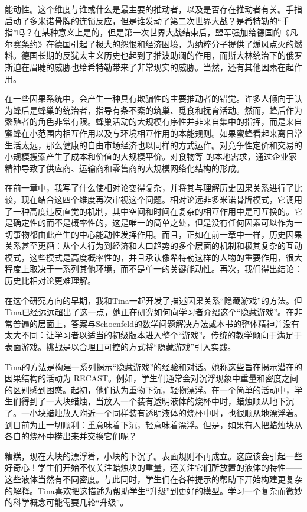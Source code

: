 能动性。这个维度与谁或什么是最主要的推动者，以及是否存在推动者有关。手指启动了多米诺骨牌的连锁反应，但是谁发动了第二次世界大战？是希特勒的“手指”吗？在某种意义上是的，但是第一次世界大战结束后，盟军强加给德国的《凡尔赛条约》在德国引起了极大的怨恨和经济困境，为纳粹分子提供了煽风点火的燃料。德国长期的反犹太主义历史也起到了推波助澜的作用，而斯大林统治下的俄罗斯迫在眉睫的威胁也给希特勒带来了非常现实的威胁。当然，还有其他因素在起作用。

在一些因果系统中，会产生一种具有欺骗性的主要推动者的错觉。许多人倾向于认为蜂后是蜂巢的统治者，指导有条不紊的筑巢、觅食和抚育活动。然而，蜂后作为繁殖者的角色非常有限。蜂巢活动的大规模有序性并非来自集中的指挥，而是来自蜜蜂在小范围内相互作用以及与环境相互作用的本能规则。如果蜜蜂看起来离日常生活太远，那么健康的自由市场经济也以同样的方式运作。对竞争性定价和交易的小规模搜索产生了成本和价值的大规模平价。对食物等 的本地需求，通过企业家精神导致了供应商、运输商和零售商的大规模网络化结构的形成。

在前一章中，我写了什么使相对论变得复杂，并将其与理解历史因果关系进行了比较，现在结合这四个维度再次审视这个问题。相对论远非多米诺骨牌模式，它调用了一种高度违反直觉的机制，其中空间和时间在复杂的相互作用中是可互换的。它是确定性的而不是概率性的，这是唯一的简单之处，但是没有任何因素可以作为一切事物都由此产生的中心能动性发挥作用。而且，正如在前一章中一样，历史因果关系甚至更糟：从个人行为到经济和人口趋势的多个层面的机制和极其复杂的互动模式，这些模式是高度概率性的，并且承认像希特勒这样的人物的重要作用，很大程度上取决于一系列其他环境，而不是单一的关键能动性。再次，我们得出结论：历史比相对论更难理解。

在这个研究方向的早期，我和Tina一起开发了描述因果关系“隐藏游戏”的方法。但Tina已经远远超出了这一点，她正在研究如何向学习者介绍这个“隐藏游戏”。在非常普遍的层面上，答案与Schoenfeld的数学问题解决方法或本书的整体精神并没有太大不同：让学习者以适当的初级版本进入整个“游戏”。传统的教学倾向于满足于表面游戏。挑战是以合理且可控的方式将“隐藏游戏”引入实践。

Tina的方法是构建一系列揭示“隐藏游戏”的经验和对话。她称这些旨在揭示潜在的因果结构的活动为 RECAST。例如，学生们通常会对沉浮现象中重量和密度之间的区别感到困惑。起初，他们认为重物下沉，轻物漂浮。在一个简单的活动中，学生们得到了一大块蜡烛，当放入一个装有透明液体的烧杯中时，蜡烛顺从地下沉了。一小块蜡烛放入附近一个同样装有透明液体的烧杯中时，也很顺从地漂浮着。到目前为止一切顺利：重意味着下沉，轻意味着漂浮。但是，如果有人把蜡烛块从各自的烧杯中捞出来并交换它们呢？

糟糕，现在大块的漂浮着，小块的下沉了。表面规则不再成立。这应该会引起一些好奇心！学生们开始不仅关注蜡烛块的重量，还关注它们所放置的液体的特性——这些液体当然有不同密度。与此同时，学生们在各种提示的帮助下开始构建更复杂的解释。Tina喜欢把这描述为帮助学生“升级”到更好的模型。学习一个复杂而微妙的科学概念可能需要几轮“升级”。


